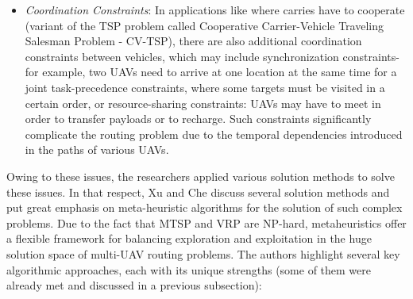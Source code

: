 \documentclass[conference]{IEEEtran}
\begin{document}
\begin{itemize}
    \item \textit{Coordination Constraints}: In applications like where carries have to cooperate (variant of the TSP problem called Cooperative Carrier-Vehicle Traveling Salesman Problem - CV-TSP), there are also additional coordination constraints between vehicles, which may include synchronization constraints-for example, two UAVs need to arrive at one location at the same time for a joint task-precedence constraints, where some targets must be visited in a certain order, or resource-sharing constraints: UAVs may have to meet in order to transfer payloads or to recharge. Such constraints significantly complicate the routing problem due to the temporal dependencies introduced in the paths of various UAVs. 
\end{itemize}

Owing to these issues, the researchers applied various solution methods to solve these issues. In that respect, Xu and Che discuss several solution methods and put great emphasis on meta-heuristic algorithms for the solution of such complex problems. Due to the fact that MTSP and VRP are NP-hard, metaheuristics offer a flexible framework for balancing exploration and exploitation in the huge solution space of multi-UAV routing problems. The authors highlight several key algorithmic approaches, each with its unique strengths (some of them were already met and discussed in a previous subsection):
\end{document}
